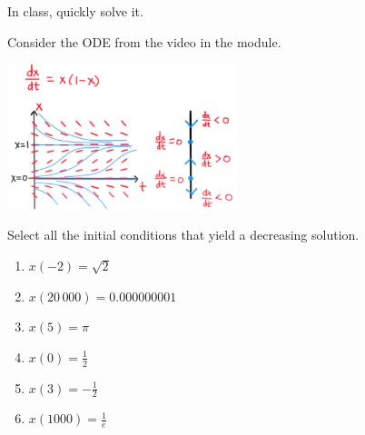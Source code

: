 \begin{annotation}
\begin{goals}
	In class, quickly solve it.
\end{goals}	
\end{annotation}
\question \label{autonomous:preclass}
	Consider the ODE from the video in the module.

\begin{center}
	\includegraphics*[width=190pt]{images/module14-preclass.png}
\end{center}
Select all the initial conditions that yield a decreasing solution.
\begin{enumerate}[label=\color{gray}(\alph*)]
	\item $x(-2)=\sqrt{2}$
	\item $x(20\,000)=0.000000001$
	\item $x(5)=\pi$
	\item $x(0)=\frac12$
	\item $x(3)=-\frac12$
	\item $x(1000) = \frac1e$
\end{enumerate}




\bookonlynewpage



